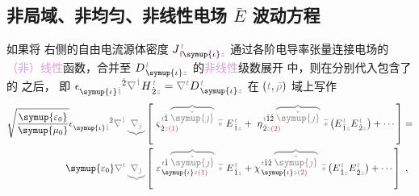 \vspace*{-5.0em}

\subsection{非局域、非均匀、非线性电场 $\bar{E}$ 波动方程}\label{ssec:Exp-waveq}

\vspace*{-0.5em}

如果将  右侧的自由电流源体密度 $J^{\;\!\mathcolor{gray}{t}}_{\;\! \textcolor{Maroon}{\text{f}} \symup{\iota}\mathcolor{gray}{z}}$ 通过各阶电导率张量连接电场的\textcolor{Plum}{（非）线性}函数，合并至 $D^{\;\!\mathcolor{gray}{t}}_{\;\! \symup{\iota}\mathcolor{gray}{z}}$ 的\textcolor{Plum}{非线性}级数展开  中，则在分别代入包含了  的  之后， 即 $\epsilon^{\hphantom{\symup{\iota}\dot{1}}\dot{2}}_{\symup{\iota}\mathcolor{gray}{\dot{1}}} \mathcolor{gray}{\nabla^{\dot{1}}} H^{\;\!\mathcolor{gray}{t}}_{\;\! \dot{2}\mathcolor{gray}{z}} = \mathcolor{gray}{\nabla^t} D^{\;\!\mathcolor{gray}{t}}_{\;\! \symup{\iota}\mathcolor{gray}{z}}$ 在 $\left( \mathcolor{gray}{t}, \mathcolor{gray}{\bar{\rho}} \right)$ 域上写作
\clearpage
\vspace*{-4.5em}
\begin{subequations}
\begin{align}
	\sqrt{\frac{\symup{\varepsilon_0}}{\symup{\mu_0}}} \epsilon^{\hphantom{\symup{\iota}\dot{1}}\dot{2}}_{\symup{\iota}\mathcolor{gray}{\dot{1}}} \mathcolor{gray}{\nabla^{\dot{1}}} \mathcolor{gray}{\underbrace{\nabla_{\check{\jmath}}}} &\left[~ \varsigma^{\;\! \mathcolor{gray}{t} \hat{1} \;\! \mathcolor{gray}{\overbrace{\check{\symup{\jmath}}}}}_{\;\! \dot{2} \mathcolor{gray}{z} \textcolor{Maroon}{(1)}} ~\mathcolor{gray}{\widetilde *}~ E^{\;\!\mathcolor{gray}{t}}_{\;\! \hat{1} \mathcolor{gray}{z}} + ~\eta^{\;\! \mathcolor{gray}{t} \hat{1} \hat{2} \;\! \mathcolor{gray}{\overbrace{\check{\symup{\jmath}}}}}_{\;\! \dot{2} \mathcolor{gray}{z} \textcolor{Maroon}{(2)}} ~\mathcolor{gray}{\widetilde *} \left( E^{\;\!\mathcolor{gray}{t}}_{\;\! \hat{1} \mathcolor{gray}{z}} E^{\;\!\mathcolor{gray}{t}}_{\;\! \hat{2} \mathcolor{gray}{z}} \right) + \cdots \right] \label{eq:wave_trho} = \\
	{\symup{\varepsilon_0}} \mathcolor{gray}{\nabla^t} \mathcolor{gray}{\underbrace{\nabla_{\check{\jmath}}}} &\left[~ \varepsilon^{\;\! \mathcolor{gray}{t} \hat{1} \;\! \mathcolor{gray}{\overbrace{\check{\symup{\jmath}}}}}_{\;\! \symup{\iota} \mathcolor{gray}{z} \textcolor{Maroon}{(1)}} ~\mathcolor{gray}{\widetilde *}~ E^{\;\!\mathcolor{gray}{t}}_{\;\! \hat{1} \mathcolor{gray}{z}} + \chi^{\;\! \mathcolor{gray}{t} \hat{1} \hat{2} \;\! \mathcolor{gray}{\overbrace{\check{\symup{\jmath}}}}}_{\;\! \symup{\iota} \mathcolor{gray}{z} \textcolor{Maroon}{(2)}} ~\mathcolor{gray}{\widetilde *} \left( E^{\;\!\mathcolor{gray}{t}}_{\;\! \hat{1} \mathcolor{gray}{z}} E^{\;\!\mathcolor{gray}{t}}_{\;\! \hat{2} \mathcolor{gray}{z}} \right) + \cdots \right]~,
\end{align}
\end{subequations}
